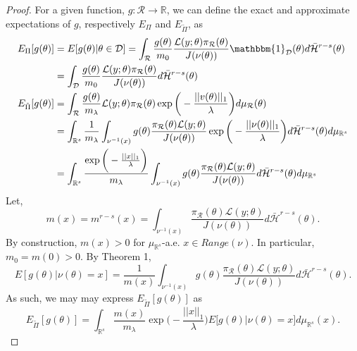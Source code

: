 \documentclass[10pt,fleqn]{article}
\DeclareMathOperator{\1}{\mathbbm{1}}
\begin{document}
{\begin{proof}

For a given function, $g:\mathcal{R}\to\mathbb{R}$, we can define the exact and approximate expectations of $g$, respectively $E_\Pi$ and $E_{\tilde{\Pi}}$, as
\begin{align*}
E_\Pi[g(\theta)] &= E[g(\theta)|\theta\in\mathcal{D}] = \int_\mathcal{R} \frac{g(\theta)}{m_0} \frac{\mathcal{L}(y;\theta)\pi_\mathcal{R}(\theta)}{J(\nu(\theta))}\mathbbm{1}_\mathcal{D}(\theta)d\bar{\mathcal{H}}^{r-s}(\theta) \\
&=\int_\mathcal{D} \frac{g(\theta)}{m_0} \frac{\mathcal{L}(y;\theta)\pi_\mathcal{R}(\theta)}{J(\nu(\theta))}d\bar{\mathcal{H}}^{r-s}(\theta)\\
E_{\tilde{\Pi}}[g(\theta)] &= \int_\mathcal{R}  \frac{g(\theta)}{m_\lambda} \mathcal{L}(y;\theta)\pi_\mathcal{R}(\theta)\exp\bigg(-\frac{||v(\theta)||_1}{\lambda}\bigg)d\mu_\mathcal{R}(\theta) \\
&= \int_{\mathbb{R}^s} \frac{1}{m_\lambda} \int_{\nu^{-1}(x)} g(\theta) \frac{\pi_\mathcal{R}(\theta)\mathcal{L}(y;\theta)}{J(\nu(\theta))} \exp\bigg(-\frac{||\nu(\theta)||_1}{\lambda}\bigg) d\bar{\mathcal{H}}^{r-s}(\theta) d\mu_{\mathbb{R}^s} \\
&=\int_{\mathbb{R}^s} \frac{\exp\bigg(-\frac{||x||_1}{\lambda}\bigg) }{m_\lambda} \int_{\nu^{-1}(x)} g(\theta) \frac{\pi_\mathcal{R}(\theta)\mathcal{L}(y;\theta)}{J(\nu(\theta))} d\bar{\mathcal{H}}^{r-s}(\theta) d\mu_{\mathbb{R}^s} 
\end{align*}
Let, $$m(x) = m^{r-s}(x) = \int_{\nu^{-1}(x)}\frac{\pi_\mathcal{R}(\theta)\mathcal{L}(y;\theta)}{J(\nu(\theta))} d\bar{\mathcal{H}}^{r-s}(\theta) .$$
By construction, $m(x) > 0$ for $\mu_{\mathbb{R}^s}$-a.e. $x\in Range(\nu)$. In particular, $m_0=m(0)>0$. By Theorem 1,
\begin{equation}
E[g(\theta) | \nu(\theta) = x] = \frac{1}{m(x)} \int_{\nu^{-1}(x)} g(\theta)\frac{\pi_\mathcal{R}(\theta)\mathcal{L}(y;\theta)}{J(\nu(\theta))} d\bar{\mathcal{H}}^{r-s}(\theta).
\end{equation}
As such, we may may express $E_{\tilde{\Pi}}[g(\theta)]$ as 
\begin{equation}
E_{\tilde{\Pi}}[g(\theta)] = \int_{\mathbb{R}^s} \frac{m(x)}{m_\lambda}\exp\bigg(-\frac{||x||_1}{\lambda}\bigg) E\big[g(\theta)|\nu(\theta)=x\big] d\mu_{\mathbb{R}^s}(x).
\end{equation}


\end{proof}}
\end{document}
